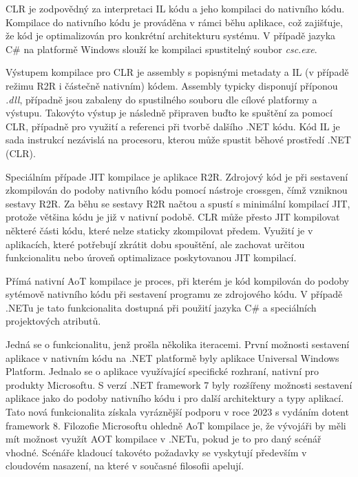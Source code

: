 CLR je zodpovědný za interpretaci IL kódu a jeho kompilaci do nativního kódu. Kompilace do nativního kódu je prováděna v rámci běhu aplikace, což zajišťuje, že kód je optimalizován pro konkrétní architekturu systému. V případě jazyka C\# na platformě Windows slouží ke kompilaci spustitelný soubor \emph{csc.exe}. 

Výstupem kompilace pro CLR je assembly s popisnými metadaty a IL (v případě režimu R2R i částečně nativním) kódem. Assembly typicky disponují příponou \emph{.dll}, případně jsou zabaleny do spustilného souboru dle cílové platformy a výstupu. Takovýto výstup je následně připraven buďto ke spuštění za pomocí CLR, případně pro využití a referenci při tvorbě dalšího .NET kódu. Kód IL je sada instrukcí nezávislá na procesoru, kterou může spustit běhové prostředí .NET (CLR).

Speciálním případe JIT kompilace je aplikace R2R. Zdrojový kód je při sestavení zkompilován do podoby nativního kódu pomocí nástroje crossgen, čímž vzniknou sestavy R2R. Za běhu se sestavy R2R načtou a spustí s minimální kompilací JIT, protože většina kódu je již v nativní podobě. CLR může přesto JIT kompilovat některé části kódu, které nelze staticky zkompilovat předem. Využití je v aplikacích, které potřebují zkrátit dobu spouštění, ale zachovat určitou funkcionalitu nebo úroveň optimalizace poskytovanou JIT kompilací.


Přímá nativní AoT kompilace je proces, při kterém je kód kompilován do podoby sytémově nativního kódu při sestavení programu ze zdrojového kódu. V případě .NETu je tato funkcionalita dostupná při použití jazyka C\# a speciálních projektových atributů. 

Jedná se o funkcionalitu, jenž prošla několika iteracemi. První možnosti sestavení aplikace v nativním kódu na .NET platformě byly aplikace Universal Windows Platform. Jednalo se o aplikace využívající specifické rozhraní, nativní pro produkty Microsoftu. S verzí .NET framework 7 byly rozšířeny možnosti sestavení aplikace jako do podoby nativního kódu i pro další architektury a typy aplikací. Tato nová funkcionalita získala vyráznější podporu v roce 2023 s vydáním dotent framework 8. Filozofie Microsoftu ohledně AoT kompilace je, že vývojáři by měli mít možnost využít AOT kompilace v .NETu, pokud je to pro daný scénář vhodné. Scénáře kladoucí takovéto požadavky se vyskytují především v cloudovém nasazení, na které v současné filosofii apelují. 


